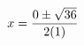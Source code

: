 \documentclass[preview]{standalone}
\begin{document}
\begin{align*}
\special{dvisvgm:raw <g id='unique000'>}x=\frac{0\pm\sqrt{36}}{2(1)}\special{dvisvgm:raw </g>}
\end{align*}
\end{document}
